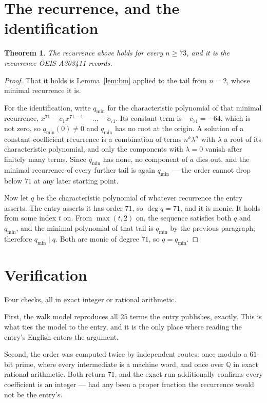 \documentclass[11pt,a4paper]{article}
\theoremstyle{plain}
\newtheorem{theorem}{Theorem}
\theoremstyle{definition}
\begin{document}
\section{The recurrence, and the identification}

\begin{theorem}
The recurrence above holds for every $n\ge73$, and it is the recurrence OEIS A303411 records.
\end{theorem}

\begin{proof}
That it holds is Lemma~\ref{lem:bm} applied to the tail from $n=2$, whose minimal
recurrence it is.

For the identification, write $q_{\min}$ for the characteristic polynomial of that minimal
recurrence, $x^{71}-c_1x^{71-1}-\dots-c_{71}$. Its constant term is
$-c_{71}=-64$, which is not zero, so $q_{\min}(0)\neq0$ and $q_{\min}$ has no
root at the origin. A solution of a constant-coefficient recurrence is a combination of terms
$n^{k}\lambda^{n}$ with $\lambda$ a root of its characteristic polynomial, and only the
components with $\lambda=0$ vanish after finitely many terms. Since $q_{\min}$ has none, no
component of $a$ dies out, and the minimal recurrence of every further tail is again
$q_{\min}$ --- the order cannot drop below $71$ at any later starting point.

Now let $q$ be the characteristic polynomial of whatever recurrence the entry asserts. The
entry asserts it has order $71$, so $\deg q=71$, and it is monic. It holds from some
index $t$ on. From $\max(t,2)$ on, the sequence satisfies both $q$ and $q_{\min}$, and
the minimal polynomial of that tail is $q_{\min}$ by the previous paragraph; therefore
$q_{\min}\mid q$. Both are monic of degree $71$, so $q=q_{\min}$.
\end{proof}

\section{Verification}

Four checks, all in exact integer or rational arithmetic.

First, the walk model reproduces all $25$ terms the entry publishes, exactly. This is
what ties the model to the entry, and it is the only place where reading the entry's English
enters the argument.

Second, the order was computed twice by independent routes: once modulo a $61$-bit prime, where
every intermediate is a machine word, and once over $\mathbb{Q}$ in exact rational arithmetic.
Both return $71$, and the exact run additionally confirms every coefficient is an integer
--- had any been a proper fraction the recurrence would not be the entry's.
\end{document}
